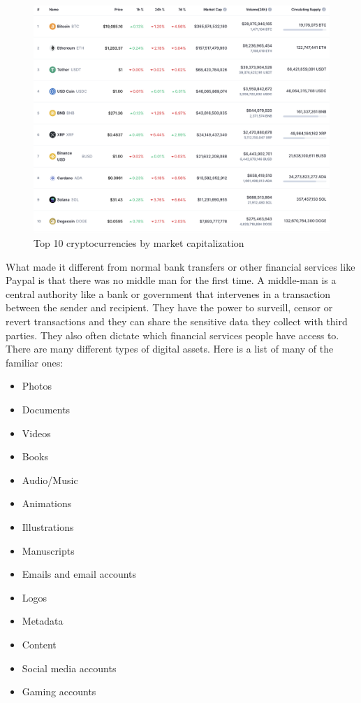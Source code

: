 \documentclass[MSE,Master,english]{twbook}%
\begin{document}
\begin{figure}[H]
  \centering
  \includegraphics[width=\textwidth]{crypto_ranking.png}
  \caption{Top 10 cryptocurrencies by market capitalization \cite{coinmarketcap}}
  \label{fig:ranking}
\end{figure}

What made it different from normal bank transfers or other financial services like Paypal is that there was no middle man for the first time. A middle-man is a central authority like a bank or government that intervenes in a transaction between the sender and recipient. They have the power to surveill, censor or revert transactions and they can share the sensitive data they collect with third parties. They also often dictate which financial services people have access to.\cite{ethereum} \\

There are many different types of digital assets.\cite{digAssets} Here is a list of many of the familiar ones:
\begin{multicols}{2}
  \begin{itemize}
    \item Photos
    \item Documents
    \item Videos
    \item Books
    \item Audio/Music
    \item Animations
    \item Illustrations
    \item Manuscripts
    \item Emails and email accounts
    \item Logos
    \item Metadata
    \item Content
    \item Social media accounts
    \item Gaming accounts
  \end{itemize}
\end{multicols}
\end{document}
